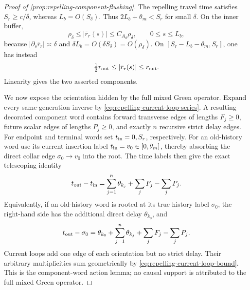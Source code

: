 \begin{proof}[Proof of
\cref{prop:repelling-component-flushing}]
The repelling travel time satisfies \(S_r\ge c/\delta\), whereas
\(L_b=O(S_\delta)\).  Thus
\(2L_b+\theta_m<S_r\) for small \(\delta\).  On the inner buffer,
\begin{equation}
 \rho_\delta\le|\bar r_r(s)|
 \le C_{A_d}\rho_\delta,\qquad 0\le s\le L_b,     \label{eq:repelling-inner-buffer-geometry}
\end{equation}
because \(|\partial_s\bar r_r|\asymp\delta\) and
\(\delta L_b=O(\delta S_\delta)=O(\rho_\delta)\).  On
\([S_r-L_b-\theta_m,S_r]\), one has instead
\begin{equation}
 \tfrac12r_{\rm out}\le|\bar r_r(s)|\le r_{\rm out}.          \label{eq:repelling-terminal-buffer-geometry}
\end{equation}
Linearity gives the two asserted components.

We now expose the orientation hidden by the full mixed Green operator.
Expand every same-generation inverse by
\cref{eq:repelling-current-loop-series}.  A resulting decorated component
word contains forward transverse edges of lengths \(F_j\ge0\), future
scalar edges of lengths \(P_j\ge0\), and exactly \(n\) recursive strict
delay edges.  For endpoint and terminal words set
\(t_{\rm in}=0,S_r\), respectively.  For an old-history word use its current
insertion label \(t_{\rm in}=v_0\in[0,\theta_m]\), thereby absorbing the
direct collar edge \(\sigma_0\to v_0\) into the root.  The time labels then
give the exact telescoping identity
\begin{equation}
 t_{\rm out}-t_{\rm in}
 =\sum_{j=1}^n\theta_{k_j}
       +\sum_jF_j-\sum_jP_j.                       \label{eq:repelling-oriented-word-identity}
\end{equation}
Equivalently, if an old-history word is rooted at its true history label
\(\sigma_0\), the right-hand side has the additional direct delay
\(\theta_{k_0}\), and
\[
 t_{\rm out}-\sigma_0
 =\theta_{k_0}+\sum_{j=1}^n\theta_{k_j}
       +\sum_jF_j-\sum_jP_j.
\]
Current loops add one edge of each orientation but no strict delay.  Their
arbitrary multiplicities sum geometrically by
\cref{eq:repelling-current-loop-bound}.  This is the component-word action
lemma; no causal support is attributed to the full mixed Green operator.


\end{proof}
